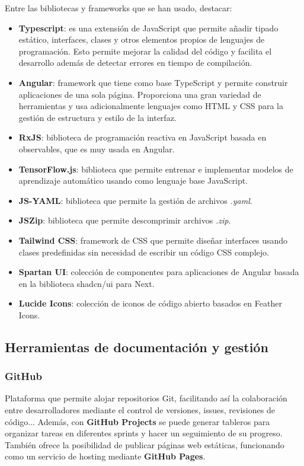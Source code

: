 Entre las bibliotecas y frameworks que se han usado, destacar:
\begin{itemize}
    \item \textbf{Typescript}: es una extensión de JavaScript que permite añadir tipado estático, interfaces, clases y otros elementos propios de lenguajes de programación. Esto permite mejorar la calidad del código y facilita el desarrollo además de detectar errores en tiempo de compilación.
    \item \textbf{Angular}: framework que tiene como base TypeScript y permite construir aplicaciones de una sola página. Proporciona una gran variedad de herramientas y usa adicionalmente lenguajes como HTML y CSS para la gestión de estructura y estilo de la interfaz.
    \item \textbf{RxJS}: biblioteca de programación reactiva en JavaScript basada en observables, que es muy usada en Angular. 
    \item \textbf{TensorFlow.js}: biblioteca que permite entrenar e implementar modelos de aprendizaje automático usando como lenguaje base JavaScript.
    \item \textbf{JS-YAML}: biblioteca que permite la gestión de archivos \textit{.yaml}.
    \item \textbf{JSZip}: biblioteca que permite descomprimir archivos \textit{.zip}.
    \item \textbf{Tailwind CSS}: framework de CSS que permite diseñar interfaces usando clases predefinidas sin necesidad de escribir un código CSS complejo.
    \item \textbf{Spartan UI}: colección de componentes para aplicaciones de Angular basada en la biblioteca shadcn/ui para Next.
    \item \textbf{Lucide Icons}: colección de iconos de código abierto basados en Feather Icons.
\end{itemize}

\newpage
\subsection{Herramientas de documentación y gestión}
\label{subsec:Gestion}
\subsubsection{GitHub}
\label{subsubsec:GitHub}
Plataforma que permite alojar repositorios Git, facilitando así la colaboración entre desarrolladores mediante el control de versiones, issues, revisiones de código... Además, con \textbf{GitHub Projects} se puede generar tableros para organizar tareas en diferentes sprints y hacer un seguimiento de su progreso. También ofrece la posibilidad de publicar páginas web estáticas, funcionando como un servicio de hosting mediante \textbf{GitHub Pages}.

